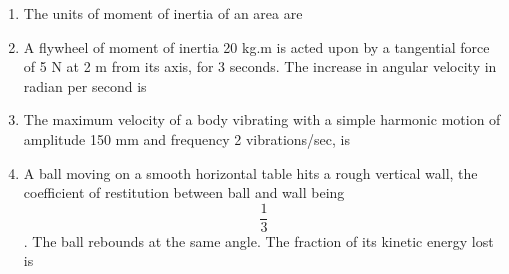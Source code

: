 \documentclass[11pt,a4paper]{article}
\begin{document}
\begin{enumerate}
\item{The units of moment of inertia of an area are}
\\
\item{A flywheel of moment of inertia 20 kg.m is acted upon by a tangential force of 5 N at 2 m from its axis, for 3 seconds. The increase in angular velocity in radian per second is}
\\
\item{The maximum velocity of a body vibrating with a simple harmonic motion of amplitude 150 mm and frequency 2 vibrations/sec, is}
\\
\item{A ball moving on a smooth horizontal table hits a rough vertical wall, the coefficient of restitution between ball and wall being $$\frac{1}{3}$$. The ball rebounds at the same angle. The fraction of its kinetic energy lost is}
\\

\end{enumerate}
\end{document}
